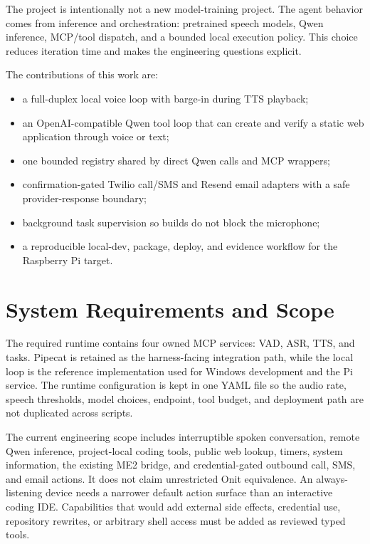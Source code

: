 \documentclass[sigconf,nonacm]{acmart}
\begin{document}
The project is intentionally not a new model-training project. The agent
behavior comes from inference and orchestration: pretrained speech models,
Qwen inference, MCP/tool dispatch, and a bounded local execution policy. This
choice reduces iteration time and makes the engineering questions explicit.

The contributions of this work are:
\begin{itemize}[leftmargin=*]
\item a full-duplex local voice loop with barge-in during TTS playback;
\item an OpenAI-compatible Qwen tool loop that can create and verify a static
web application through voice or text;
\item one bounded registry shared by direct Qwen calls and MCP wrappers;
\item confirmation-gated Twilio call/SMS and Resend email adapters with a
safe provider-response boundary;
\item background task supervision so builds do not block the microphone;
\item a reproducible local-dev, package, deploy, and evidence workflow for the
Raspberry Pi target.
\end{itemize}

\section{System Requirements and Scope}

The required runtime contains four owned MCP services: VAD, ASR, TTS, and
tasks. Pipecat is retained as the harness-facing integration path, while the
local loop is the reference implementation used for Windows development and
the Pi service. The runtime configuration is kept in one YAML file so the
audio rate, speech thresholds, model choices, endpoint, tool budget, and
deployment path are not duplicated across scripts.

The current engineering scope includes interruptible spoken conversation,
remote Qwen inference, project-local coding tools, public web lookup, timers,
system information, the existing ME2 bridge, and credential-gated outbound
call, SMS, and email actions. It does not claim unrestricted
Onit equivalence. An always-listening device needs a narrower default action
surface than an interactive coding IDE. Capabilities that would add external
side effects, credential use, repository rewrites, or arbitrary shell access
must be added as reviewed typed tools.
\end{document}

